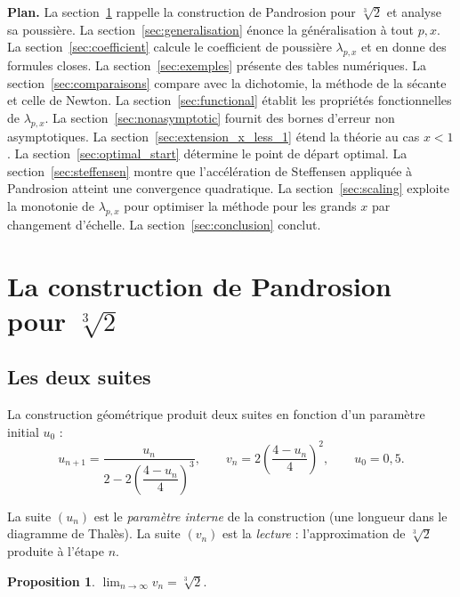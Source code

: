 \documentclass[11pt,a4paper]{article}
\theoremstyle{definition}
\newtheorem{proposition}{Proposition}[section]
\newcommand{\cbrt}[1]{\sqrt[3]{#1}}
\begin{document}
\textbf{Plan.} La section~\ref{sec:pandrosion3} rappelle la construction de Pandrosion pour $\cbrt{2}$ et analyse sa poussière. La section~\ref{sec:generalisation} énonce la généralisation à tout $p, x$. La section~\ref{sec:coefficient} calcule le coefficient de poussière $\lambda_{p,x}$ et en donne des formules closes. La section~\ref{sec:exemples} présente des tables numériques. La section~\ref{sec:comparaisons} compare avec la dichotomie, la méthode de la sécante et celle de Newton. La section~\ref{sec:functional} établit les propriétés fonctionnelles de $\lambda_{p,x}$. La section~\ref{sec:nonasymptotic} fournit des bornes d'erreur non asymptotiques. La section~\ref{sec:extension_x_less_1} étend la théorie au cas $x < 1$. La section~\ref{sec:optimal_start} détermine le point de départ optimal. La section~\ref{sec:steffensen} montre que l'accélération de Steffensen appliquée à Pandrosion atteint une convergence quadratique. La section~\ref{sec:scaling} exploite la monotonie de $\lambda_{p,x}$ pour optimiser la méthode pour les grands $x$ par changement d'échelle. La section~\ref{sec:conclusion} conclut.

\section{La construction de Pandrosion pour \texorpdfstring{$\cbrt{2}$}{cbrt(2)}}
\label{sec:pandrosion3}

\subsection{Les deux suites}

La construction géométrique produit deux suites en fonction d'un paramètre initial $u_0$ :
\begin{equation}
  \label{eq:pandrosion_orig}
  u_{n+1} = \frac{u_n}{2 - 2\!\left(\dfrac{4 - u_n}{4}\right)^{\!3}},
  \qquad
  v_n = 2\!\left(\frac{4 - u_n}{4}\right)^{\!2},
  \qquad u_0 = 0{,}5.
\end{equation}

La suite $(u_n)$ est le \emph{paramètre interne} de la construction (une longueur dans le diagramme de Thalès). La suite $(v_n)$ est la \emph{lecture} : l'approximation de $\cbrt{2}$ produite à l'étape $n$.

\begin{proposition}
$\displaystyle\lim_{n\to\infty} v_n = \cbrt{2}$.
\end{proposition}
\end{document}
